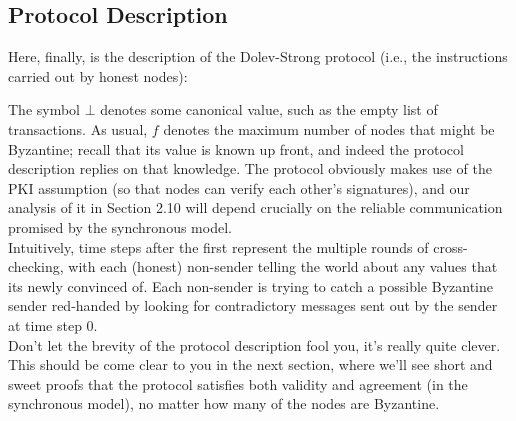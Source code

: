 
\subsection{Protocol Description}
Here, finally, is the description of the Dolev-Strong protocol (i.e., the instructions carried
out by honest nodes):



The symbol $\bot$ denotes some canonical value, such as the empty list of transactions. As
usual, $f$ denotes the maximum number of nodes that might be Byzantine; recall that its
value is known up front, and indeed the protocol description replies on that knowledge.
The protocol obviously makes use of the PKI assumption (so that nodes can verify each
other’s signatures), and our analysis of it in Section 2.10 will depend crucially on the reliable
communication promised by the synchronous model.\\
Intuitively, time steps after the first represent the multiple rounds of cross-checking, with
each (honest) non-sender telling the world about any values that its newly convinced of.
Each non-sender is trying to catch a possible Byzantine sender red-handed by looking for
contradictory messages sent out by the sender at time step 0.\\
Don’t let the brevity of the protocol description fool you, it’s really quite clever. This
should be come clear to you in the next section, where we’ll see short and sweet proofs that
the protocol satisfies both validity and agreement (in the synchronous model), no matter
how many of the nodes are Byzantine.

